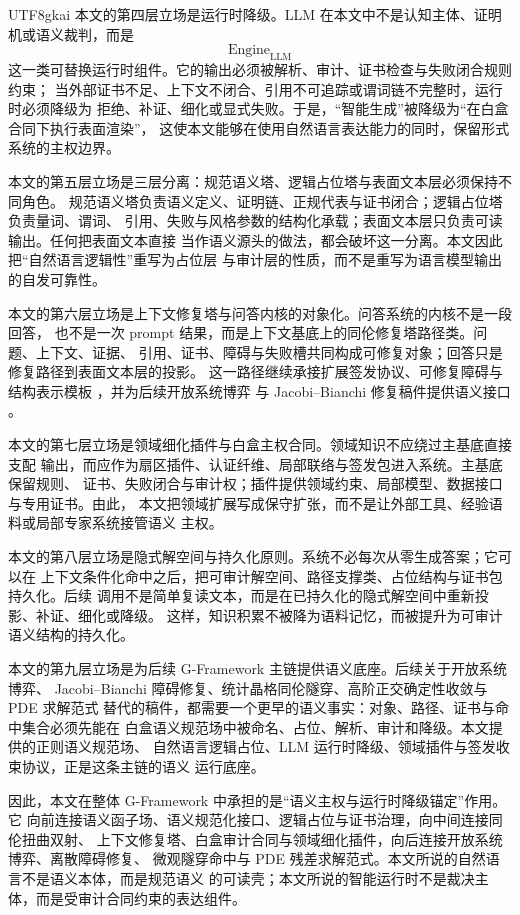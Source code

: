 \documentclass[12pt]{article}
\newcommand{\GFramework}{\textsf{G-Framework}}
\newcommand{\Engine}{\operatorname{Engine}}
\begin{document}
\begin{CJK*}{UTF8}{gkai}
本文的第四层立场是运行时降级。LLM 在本文中不是认知主体、证明机或语义裁判，而是
\[
  \Engine_{\mathrm{LLM}}
\]
这一类可替换运行时组件。它的输出必须被解析、审计、证书检查与失败闭合规则约束；
当外部证书不足、上下文不闭合、引用不可追踪或谓词链不完整时，运行时必须降级为
拒绝、补证、细化或显式失败。于是，“智能生成”被降级为“在白盒合同下执行表面渲染”，
这使本文能够在使用自然语言表达能力的同时，保留形式系统的主权边界。

本文的第五层立场是三层分离：规范语义塔、逻辑占位塔与表面文本层必须保持不同角色。
规范语义塔负责语义定义、证明链、正规代表与证书闭合；逻辑占位塔负责量词、谓词、
引用、失败与风格参数的结构化承载；表面文本层只负责可读输出。任何把表面文本直接
当作语义源头的做法，都会破坏这一分离。本文因此把“自然语言逻辑性”重写为占位层
与审计层的性质，而不是重写为语言模型输出的自发可靠性。

本文的第六层立场是上下文修复塔与问答内核的对象化。问答系统的内核不是一段回答，
也不是一次 prompt 结果，而是上下文基底上的同伦修复塔路径类。问题、上下文、证据、
引用、证书、障碍与失败槽共同构成可修复对象；回答只是修复路径到表面文本层的投影。
这一路径继续承接扩展签发协议、可修复障碍与结构表示模板
\cite{RepoTex35ExtendedCertificationTower,RepoTex29RepairableObstruction}，并为后续开放系统博弈
与 Jacobi--Bianchi 修复稿件提供语义接口 \cite{RepoTex38JacobiBianchiRepair}。

本文的第七层立场是领域细化插件与白盒主权合同。领域知识不应绕过主基底直接支配
输出，而应作为扇区插件、认证纤维、局部联络与签发包进入系统。主基底保留规则、
证书、失败闭合与审计权；插件提供领域约束、局部模型、数据接口与专用证书。由此，
本文把领域扩展写成保守扩张，而不是让外部工具、经验语料或局部专家系统接管语义
主权。

本文的第八层立场是隐式解空间与持久化原则。系统不必每次从零生成答案；它可以在
上下文条件化命中之后，把可审计解空间、路径支撑类、占位结构与证书包持久化。后续
调用不是简单复读文本，而是在已持久化的隐式解空间中重新投影、补证、细化或降级。
这样，知识积累不被降为语料记忆，而被提升为可审计语义结构的持久化。

本文的第九层立场是为后续 \GFramework{} 主链提供语义底座。后续关于开放系统博弈、
Jacobi--Bianchi 障碍修复、统计晶格同伦隧穿、高阶正交确定性收敛与 PDE 求解范式
替代的稿件，都需要一个更早的语义事实：对象、路径、证书与命中集合必须先能在
白盒语义规范场中被命名、占位、解析、审计和降级。本文提供的正则语义规范场、
自然语言逻辑占位、LLM 运行时降级、领域插件与签发收束协议，正是这条主链的语义
运行底座。

因此，本文在整体 \GFramework{} 中承担的是“语义主权与运行时降级锚定”作用。它
向前连接语义函子场、语义规范化接口、逻辑占位与证书治理，向中间连接同伦扭曲双射、
上下文修复塔、白盒审计合同与领域细化插件，向后连接开放系统博弈、离散障碍修复、
微观隧穿命中与 PDE 残差求解范式。本文所说的自然语言不是语义本体，而是规范语义
的可读壳；本文所说的智能运行时不是裁决主体，而是受审计合同约束的表达组件。


\end{CJK*}
\end{document}
